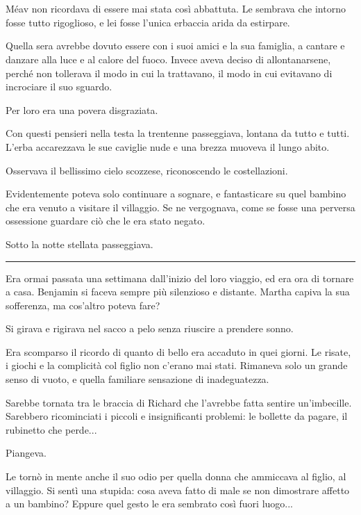 \chapter{}
\label{ch:3}

Méav non ricordava di essere mai stata così abbattuta. Le sembrava che intorno fosse tutto
rigoglioso, e lei fosse l'unica erbaccia arida da estirpare.

Quella sera avrebbe dovuto essere con i suoi amici e la sua famiglia, a cantare e danzare alla luce
e al calore del fuoco. Invece aveva deciso di allontanarsene, perché non tollerava il modo in cui la
trattavano, il modo in cui evitavano di incrociare il suo sguardo.

Per loro era una povera disgraziata.

Con questi pensieri nella testa la trentenne passeggiava, lontana da tutto e tutti. L'erba
accarezzava le sue caviglie nude e una brezza muoveva il lungo abito.

Osservava il bellissimo cielo scozzese, riconoscendo le costellazioni.

Evidentemente poteva solo continuare a sognare, e fantasticare su quel bambino che era venuto a
visitare il villaggio. Se ne vergognava, come se fosse una perversa ossessione guardare ciò che le
era stato negato.

Sotto la notte stellata passeggiava.

\plainbreak{1}

Era ormai passata una settimana dall'inizio del loro viaggio, ed era ora di tornare a casa. Benjamin
si faceva sempre più silenzioso e distante. Martha capiva la sua sofferenza, ma cos'altro poteva
fare?

Si girava e rigirava nel sacco a pelo senza riuscire a prendere sonno.

Era scomparso il ricordo di quanto di bello era accaduto in quei giorni. Le risate, i giochi e la
complicità col figlio non c'erano mai stati. Rimaneva solo un grande senso di vuoto, e quella
familiare sensazione di inadeguatezza.

Sarebbe tornata tra le braccia di Richard che l'avrebbe fatta sentire un'imbecille. Sarebbero
ricominciati i piccoli e insignificanti problemi: le bollette da pagare, il rubinetto che perde...

Piangeva.

Le tornò in mente anche il suo odio per quella donna che ammiccava al figlio, al villaggio. Si sentì
una stupida: cosa aveva fatto di male se non dimostrare affetto a un bambino? Eppure quel gesto le
era sembrato così fuori luogo...

